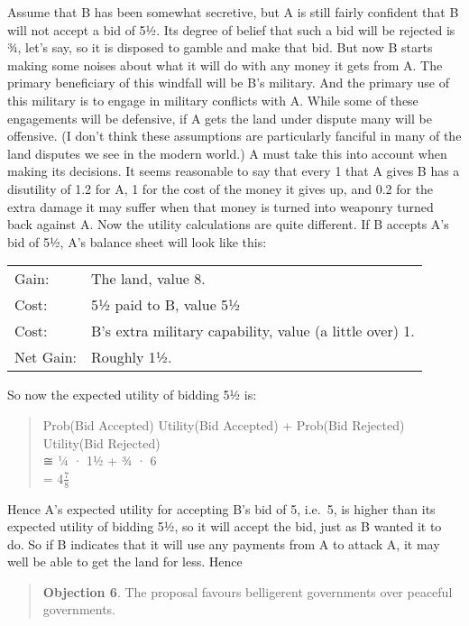 \documentclass[
  11pt,
  letterpaper,
  DIV=11,
  numbers=noendperiod,
  twoside]{scrartcl}
\begin{document}
Assume that B has been somewhat secretive, but A is still fairly
confident that B will not accept a bid of 5½. Its degree of belief that
such a bid will be rejected is ¾, let's say, so it is disposed to gamble
and make that bid. But now B starts making some noises about what it
will do with any money it gets from A. The primary beneficiary of this
windfall will be B's military. And the primary use of this military is
to engage in military conflicts with A. While some of these engagements
will be defensive, if A gets the land under dispute many will be
offensive. (I don't think these assumptions are particularly fanciful in
many of the land disputes we see in the modern world.) A must take this
into account when making its decisions. It seems reasonable to say that
every 1 that A gives B has a disutility of 1.2 for A, 1 for the cost of
the money it gives up, and 0.2 for the extra damage it may suffer when
that money is turned into weaponry turned back against A. Now the
utility calculations are quite different. If B accepts A's bid of 5½,
A's balance sheet will look like this:

\begin{longtable}[]{@{}ll@{}}
\toprule\noalign{}
\endhead
\bottomrule\noalign{}
\endlastfoot
Gain: & The land, value 8. \\
Cost: & 5½ paid to B, value 5½ \\
Cost: & B's extra military capability, value (a little over) 1. \\
Net Gain: & Roughly 1½. \\
\end{longtable}

So now the expected utility of bidding 5½ is:

\begin{quote}
Prob(Bid Accepted) Utility(Bid Accepted) + Prob(Bid Rejected)
Utility(Bid Rejected)\\
≅ ¼ · 1½ + ¾ · 6\\
= 4\(\frac{7}{8}\)
\end{quote}

Hence A's expected utility for accepting B's bid of 5, i.e.~5, is higher
than its expected utility of bidding 5½, so it will accept the bid, just
as B wanted it to do. So if B indicates that it will use any payments
from A to attack A, it may well be able to get the land for less. Hence

\begin{quote}
\textbf{Objection 6}. The proposal favours belligerent governments over
peaceful governments.
\end{quote}
\end{document}
